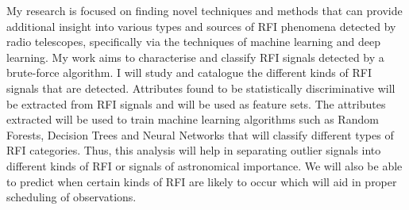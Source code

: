 \documentclass{report}
\begin{document}
My research is focused on finding novel techniques and methods that can provide additional insight into various types and sources of RFI phenomena detected by radio telescopes, specifically via the techniques of machine learning and deep learning. My work aims to characterise and classify RFI signals detected by a brute-force algorithm. I will study and catalogue the different kinds of RFI signals that are detected. Attributes found to be statistically discriminative will be extracted from RFI signals and will be used as feature sets. The attributes extracted will be used to train machine learning algorithms such as Random Forests, Decision Trees and Neural Networks that will classify different types of RFI categories. Thus,
this analysis will help in separating outlier signals into different kinds of RFI or signals of astronomical importance. We will also be able to predict when certain kinds of RFI are likely to occur which will aid in proper scheduling of observations.\newline
\newpage
\end{document}
